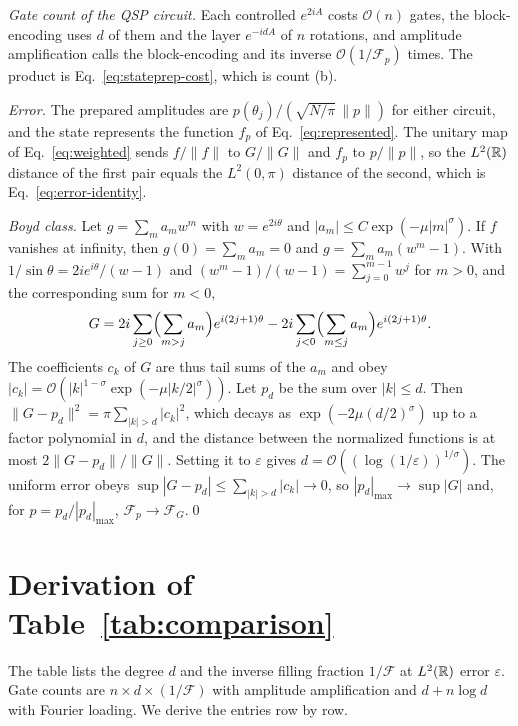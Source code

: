 \emph{Gate count of the QSP circuit.}  Each controlled $e^{2iA}$ costs
$\mathcal{O}(n)$ gates, the block-encoding uses $d$ of them and
the layer $e^{-idA}$ of $n$ rotations, and amplitude amplification
calls the block-encoding and its inverse
$\mathcal{O}(1/\mathcal{F}_p)$ times.  The product is
Eq.~\eqref{eq:stateprep-cost}, which is count (b).

\emph{Error.}  The prepared amplitudes are
$p(\theta_j)/(\sqrt{N/\pi}\,\|p\|)$ for either circuit, and the
state represents the
function $f_p$ of Eq.~\eqref{eq:represented}.  The unitary map of
Eq.~\eqref{eq:weighted} sends $f/\|f\|$ to $G/\|G\|$ and $f_p$ to
$p/\|p\|$, so the $L^2(\mathbb{R})$ distance of the first pair equals the
$L^2(0,\pi)$ distance of the second, which is
Eq.~\eqref{eq:error-identity}.

\emph{Boyd class.}  Let $g=\sum_m a_m w^m$ with $w=e^{2i\theta}$
and $|a_m|\le C\exp(-\mu|m|^\sigma)$.  If $f$ vanishes at infinity,
then $g(0)=\sum_m a_m=0$ and $g=\sum_m a_m(w^m-1)$.  With
$1/\sin\theta=2ie^{i\theta}/(w-1)$ and
$(w^m-1)/(w-1)=\sum_{j=0}^{m-1}w^j$ for $m>0$, and the
corresponding sum for $m<0$,
\begin{equation}
	G=2i\sum_{j\ge0}\Bigl(\sum_{m>j}a_m\Bigr)e^{i(2j+1)\theta}
	-2i\sum_{j<0}\Bigl(\sum_{m\le j}a_m\Bigr)e^{i(2j+1)\theta}.
\end{equation}
The coefficients $c_k$ of $G$ are thus tail sums of the $a_m$ and
obey $|c_k|=\mathcal{O}(|k|^{1-\sigma}\exp(-\mu|k/2|^\sigma))$.  Let
$p_d$ be the sum over $|k|\le d$.  Then
$\|G-p_d\|^2=\pi\sum_{|k|>d}|c_k|^2$, which decays as
$\exp(-2\mu(d/2)^\sigma)$ up to a factor polynomial in $d$, and the
distance
between the normalized functions is at most $2\|G-p_d\|/\|G\|$.
Setting it to $\varepsilon$ gives
$d=\mathcal{O}((\log(1/\varepsilon))^{1/\sigma})$.  The uniform
error obeys $\sup|G-p_d|\le\sum_{|k|>d}|c_k|\to0$, so
$|p_d|_{\max}\to\sup|G|$ and, for $p=p_d/|p_d|_{\max}$,
$\mathcal{F}_p\to\mathcal{F}_G$.\qed

\section{Derivation of Table~\ref{tab:comparison}}
\label{app:table}

The table lists the degree $d$ and the inverse filling fraction
$1/\mathcal{F}$ at $L^2(\mathbb{R})$ error $\varepsilon$.  Gate counts are
$n\times d\times(1/\mathcal{F})$ with amplitude amplification and
$d+n\log d$ with Fourier loading.  We derive the entries row by
row.

